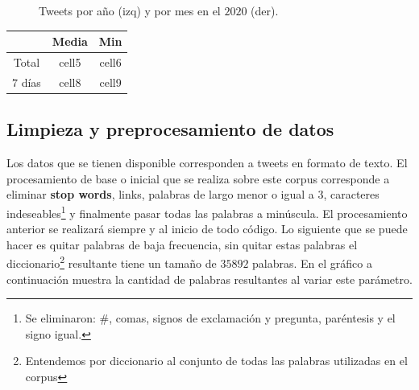 \documentclass{article}
\begin{document}
	
 	\begin{figure}[H]
 		\centering
 		\hfill
 		\caption{Tweets por año (izq) y por mes en el $2020$ (der).}
 	\end{figure}
 
	\begin{center}
		\begin{tabular}{ ||c|c|c|| } 
			\hline
			 & \textbf{Media} & \textbf{Min} \\ 
			\hline
			\hline
			Total & cell5 & cell6 \\ 
			$7$ días & cell8 & cell9 \\ 
			\hline
		\end{tabular}
	\end{center}
	
\subsection{Limpieza y preprocesamiento de datos}
	Los datos que se tienen disponible corresponden a tweets en formato de texto. El procesamiento de base o inicial que se realiza sobre este corpus corresponde a eliminar \textbf{stop words}, links, palabras de largo menor o igual a $3$, caracteres indeseables\footnote{Se eliminaron: \#, comas, signos de exclamación y pregunta, paréntesis y el signo igual.} y finalmente pasar todas las palabras a minúscula. El procesamiento anterior se realizará siempre y al inicio de todo código. Lo siguiente que se puede hacer es quitar palabras de baja frecuencia, sin quitar estas palabras el diccionario\footnote{Entendemos por diccionario al conjunto de todas las palabras utilizadas en el corpus} resultante tiene un tamaño de $35892$ palabras. En el gráfico a continuación muestra la cantidad de palabras resultantes al variar este parámetro.
	
\end{document}

